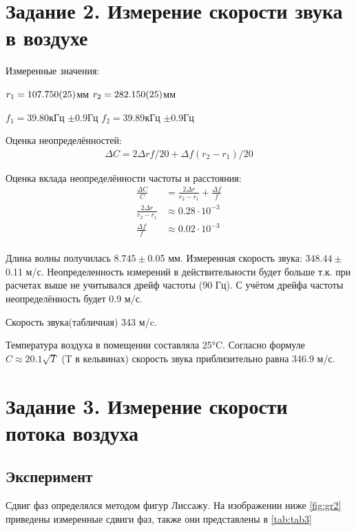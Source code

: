 \documentclass[a4paper,14pt]{article}
\begin{document}
\section {Задание 2. Измерение скорости звука в воздухе}

Измеренные значения:

$r_1 = \num{107.75 \pm 0.025}$мм
$r_2 = \num{282.15 \pm 0.025}$мм

$f_1 = 39.80$кГц $\pm 0.9$Гц
$f_2 = 39.89$кГц $\pm 0.9$Гц


Оценка неопределённостей:
\begin{equation}
\begin{aligned}
\Delta C = 2\Delta r f/20 + \Delta f(r_2-r_1)/20
\label{error}
 \end{aligned}
\end{equation}

Оценка вклада неопределённости частоты и расстояния:
\begin{equation}
\begin{aligned}
\frac{\Delta C}{C} &= \frac{2\Delta r}{r_2 - r_1} + \frac{\Delta f}{f}\\
\frac{2\Delta r}{r_2 - r_1} &\approx 0.28\cdot 10^{-3}\\
\frac{\Delta f}{f} &\approx 0.02\cdot 10^{-3}\\
\label{error2}
 \end{aligned}
\end{equation}




Длина волны получилась $8.745 \pm $0.05 мм.
Измеренная скорость звука: $348.44 \pm $0.11 м/с.
Неопределенность измерений в действительности будет больше т.к. при расчетах выше не учитывался дрейф частоты (90 Гц).
С учётом дрейфа частоты неопределённость будет 0.9 м/с.

Скорость звука(табличная) 343 м/c.

Температура воздуха в помещении составляла 25°C. Согласно формуле
$C \approx 20.1 \sqrt{T}$ (T в кельвинах)
скорость звука приблизительно равна 346.9 м/с.



\section{Задание 3. Измерение скорости потока воздуха}
\subsection{Эксперимент}
Сдвиг фаз определялся методом фигур Лиссажу.
На изображении ниже \ref{fig:gr2} приведены измеренные сдвиги фаз, также они представлены в \autoref{tab:tab3}
\end{document}

